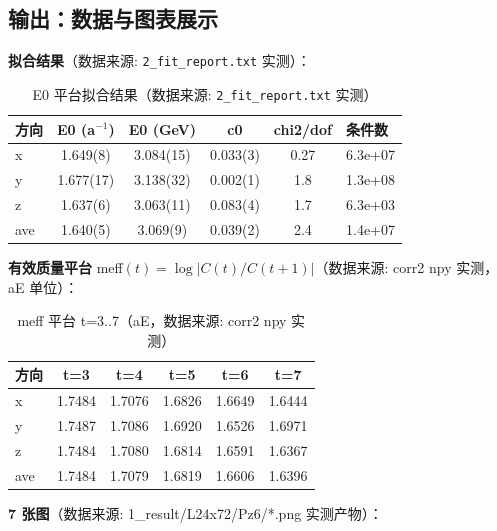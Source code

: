 \documentclass[UTF8]{ctexart}
\begin{document}
\subsection{输出：数据与图表展示}
\textbf{拟合结果}（数据来源: \texttt{\nolinkurl{2_fit_report.txt}} 实测）：
\begin{table}[htbp]\centering
\begin{tabular}{lccccl}
\toprule
方向 & E0 (a$^{-1}$) & E0 (GeV) & c0 & chi2/dof & 条件数 \\
\midrule
x & 1.649(8) & 3.084(15) & 0.033(3) & 0.27 & 6.3e+07 \\
y & 1.677(17) & 3.138(32) & 0.002(1) & 1.8 & 1.3e+08 \\
z & 1.637(6) & 3.063(11) & 0.083(4) & 1.7 & 6.3e+03 \\
ave & 1.640(5) & 3.069(9) & 0.039(2) & 2.4 & 1.4e+07 \\
\bottomrule
\end{tabular}
\caption{E0 平台拟合结果（数据来源: \texttt{\nolinkurl{2_fit_report.txt}} 实测）}
\end{table}

\textbf{有效质量平台} meff$(t)=\log|C(t)/C(t+1)|$（数据来源: corr2 npy 实测，aE 单位）：
\begin{table}[htbp]\centering
\begin{tabular}{lccccc}
\toprule
方向 & t=3 & t=4 & t=5 & t=6 & t=7 \\
\midrule
x & 1.7484 & 1.7076 & 1.6826 & 1.6649 & 1.6444 \\
y & 1.7487 & 1.7086 & 1.6920 & 1.6526 & 1.6971 \\
z & 1.7484 & 1.7080 & 1.6814 & 1.6591 & 1.6367 \\
ave & 1.7484 & 1.7079 & 1.6819 & 1.6606 & 1.6396 \\
\bottomrule
\end{tabular}
\caption{meff 平台 t=3..7（aE，数据来源: corr2 npy 实测）}
\end{table}

\textbf{7 张图}（数据来源: 1\_result/L24x72/Pz6/*.png 实测产物）：
\end{document}
